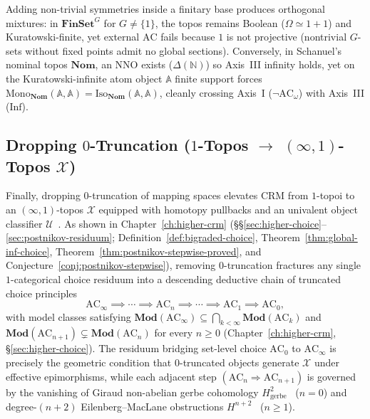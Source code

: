 Adding non-trivial symmetries inside a finitary base produces orthogonal mixtures: in $\mathbf{FinSet}^G$ for $G \neq \{1\}$, the topos remains Boolean ($\Omega \simeq 1+1$) and Kuratowski-finite, yet external $\mathrm{AC}$ fails because $1$ is not projective (nontrivial $G$-sets without fixed points admit no global sections). Conversely, in Schanuel's nominal topos $\mathbf{Nom}$, an $\mathrm{NNO}$ exists ($\Delta(\mathbb{N})$) so Axis~III infinity holds, yet on the Kuratowski-infinite atom object $\mathbb{A}$ finite support forces $\mathrm{Mono}_{\mathbf{Nom}}(\mathbb{A},\mathbb{A}) = \mathrm{Iso}_{\mathbf{Nom}}(\mathbb{A},\mathbb{A})$, cleanly crossing Axis~I ($\neg\mathrm{AC}_\omega$) with Axis~III ($\mathrm{Inf}$).

\subsection{Dropping $0$-Truncation ($1$-Topos $\to$ $(\infty, 1)$-Topos $\mathcal{X}$)}\label{sec:axis1-truncation}

Finally, dropping $0$-truncation of mapping spaces elevates $\mathrm{CRM}$ from $1$-topoi to an $(\infty, 1)$-topos $\mathcal{X}$ equipped with homotopy pullbacks and an univalent object classifier $\mathcal{U}$~\cite{Lurie09,GepnerKock17}. As shown in Chapter~\ref{ch:higher-crm} (\S\S\ref{sec:higher-choice}--\ref{sec:postnikov-residuum}; Definition~\ref{def:bigraded-choice}, Theorem~\ref{thm:global-inf-choice}, Theorem~\ref{thm:postnikov-stepwise-proved}, and Conjecture~\ref{conj:postnikov-stepwise}), removing $0$-truncation fractures any single $1$-categorical choice residuum into a descending deductive chain of truncated choice principles
\[
  \mathrm{AC}_\infty \implies \cdots \implies \mathrm{AC}_n \implies \cdots \implies \mathrm{AC}_1 \implies \mathrm{AC}_0,
\]
with model classes satisfying $\mathbf{Mod}(\mathrm{AC}_\infty) \subseteq \bigcap_{k < \infty} \mathbf{Mod}(\mathrm{AC}_k)$ and $\mathbf{Mod}(\mathrm{AC}_{n+1}) \subsetneq \mathbf{Mod}(\mathrm{AC}_n)$ for every $n \ge 0$ (Chapter~\ref{ch:higher-crm}, \S\ref{sec:higher-choice}). The residuum bridging set-level choice $\mathrm{AC}_0$ to $\mathrm{AC}_\infty$ is precisely the geometric condition that $0$-truncated objects generate $\mathcal{X}$ under effective epimorphisms, while each adjacent step $(\mathrm{AC}_n \Rightarrow \mathrm{AC}_{n+1})$ is governed by the vanishing of Giraud non-abelian gerbe cohomology $H^2_{\mathrm{gerbe}}$~\cite[Ch.~IV]{Giraud71} ($n=0$) and degree-$(n+2)$ Eilenberg--MacLane obstructions $H^{n+2}$~\cite[\S 7.2.2]{Lurie09} ($n \ge 1$).

